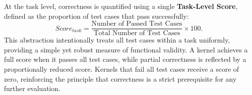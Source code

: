 At the task level, correctness is quantified using a single \textbf{Task-Level Score}, defined as the proportion of test cases that pass successfully:
\begin{equation}
   Score_{task} = \frac{\text{Number of Passed Test Cases}}{\text{Total Number of Test Cases}} \times 100.
\end{equation}
This abstraction intentionally treats all test cases within a task uniformly, providing a simple yet robust measure of functional validity. A kernel achieves a full score when it passes all test cases, while partial correctness is reflected by a proportionally reduced score. Kernels that fail all test cases receive a score of zero, reinforcing the principle that correctness is a strict prerequisite for any further evaluation.


